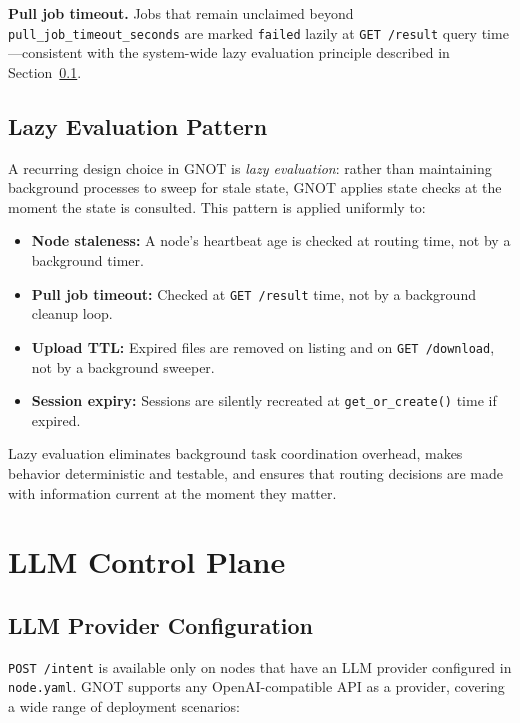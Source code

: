 \documentclass[10pt,twocolumn]{article}
\begin{document}
\textbf{Pull job timeout.} Jobs that remain unclaimed beyond
\texttt{pull\_job\_timeout\_seconds} are marked \texttt{failed} lazily
at \texttt{GET /result} query time---consistent with the system-wide
lazy evaluation principle described in Section~\ref{sec:lazy}.

\subsection{Lazy Evaluation Pattern}
\label{sec:lazy}

A recurring design choice in GNOT is \emph{lazy evaluation}: rather than
maintaining background processes to sweep for stale state, GNOT applies
state checks at the moment the state is consulted. This pattern is
applied uniformly to:

\begin{itemize}[noitemsep, leftmargin=12pt]
  \item \textbf{Node staleness:} A node's heartbeat age is checked at
    routing time, not by a background timer.
  \item \textbf{Pull job timeout:} Checked at \texttt{GET /result} time,
    not by a background cleanup loop.
  \item \textbf{Upload TTL:} Expired files are removed on listing and on
    \texttt{GET /download}, not by a background sweeper.
  \item \textbf{Session expiry:} Sessions are silently recreated at
    \texttt{get\_or\_create()} time if expired.
\end{itemize}

Lazy evaluation eliminates background task coordination overhead, makes
behavior deterministic and testable, and ensures that routing decisions
are made with information current at the moment they matter.

\section{LLM Control Plane}
\label{sec:agent}

\subsection{LLM Provider Configuration}

\texttt{POST /intent} is available only on nodes that have an LLM
provider configured in \texttt{node.yaml}. GNOT supports any
OpenAI-compatible API as a provider, covering a wide range of
deployment scenarios:
\end{document}
